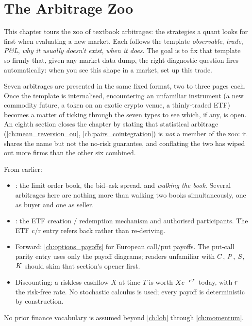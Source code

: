 \chapter{The Arbitrage Zoo}
\label{ch:arbitrage_zoo}

This chapter tours the zoo of textbook arbitrages: the strategies
a quant looks for first when evaluating a new market. Each
follows the template \emph{observable}, \emph{trade},
\emph{P\&L}, \emph{why it usually doesn't exist}, \emph{when it
does}. The goal is to fix that template so firmly that, given any
market data dump, the right diagnostic question fires
automatically: when you see this shape in a market, set up this
trade.

Seven arbitrages are presented in the same fixed format, two to
three pages each. Once the template is internalised, encountering
an unfamiliar instrument (a new commodity future, a token on
an exotic crypto venue, a thinly-traded ETF) becomes a matter
of ticking through the seven types to see which, if any, is open.
An eighth section closes the chapter by stating that statistical
arbitrage (\cref{ch:mean_reversion_ou},
\cref{ch:pairs_cointegration}) is \emph{not} a member of the zoo:
it shares the name but not the no-risk guarantee, and conflating
the two has wiped out more firms than the other six combined.

\begin{backgroundbox}[Prerequisites]
From earlier:
\begin{itemize}
  \item {}: the limit order book, the bid--ask
  spread, and \emph{walking the book}. Several arbitrages here
  are nothing more than walking two books simultaneously, one as
  buyer and one as seller.
  \item {}: the ETF creation / redemption
  mechanism and authorised participants. The ETF c/r entry
  refers back rather than re-deriving.
  \item Forward: \cref{ch:options_payoffs} for European call/put
  payoffs. The put-call parity entry uses only the payoff
  diagrams; readers unfamiliar with $C$, $P$, $S$,
  $K$ should skim that section's opener first.
  \item Discounting: a riskless cashflow $X$ at time $T$ is
  worth $X e^{-r T}$ today, with $r$ the risk-free rate.
  No stochastic calculus is used; every payoff is deterministic
  by construction.
\end{itemize}
No prior finance vocabulary is assumed beyond \cref{ch:lob}
through \cref{ch:momentum}.
\end{backgroundbox}

